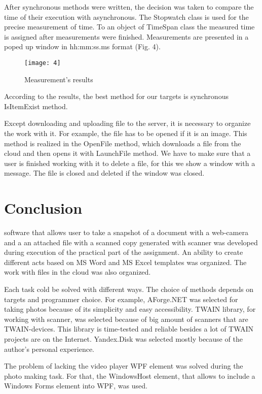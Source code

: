 \documentclass[12pt,journal,compsoc]{D:/Магистратура/English/bare_conf/IEEEtran}
\begin{document}
After synchronous methods were written, the decision was taken to compare the time of their execution with asynchronous. The Stopwatch class is used for the precise measurement of time. To an object of TimeSpan class the measured time is assigned after measurements were finished. Measurements are presented in a poped up window in hh:mm:ss.ms format (Fig. 4).
\begin{figure}[h]
\centering
\texttt{[image: 4]}
\centering
\caption{Measurement's results}
\end{figure}

According to the results, the best method for our targets is synchronous IsItemExist method.

Except downloading and uploading file to the server, it is necessary to organize the work with it. For example, the file has to be opened if it is an image. This method is realized in the OpenFile method, which downloads a file from the cloud and then opens it with LaunchFile method. We have to make sure that a user is finished working with it to delete a file, for this we show a window with a message. The file is closed and deleted if the window was closed.

\section{Conclusion}
 software that allows user to take a snapshot of a document with a web-camera and a an attached file with a scanned copy generated with scanner was developed during execution of the practical part of the assignment. An ability to create different acts based on MS Word and MS Excel templates was organized. The work with files in the cloud was also organized.

Each task cold be solved with different ways. The choice of methods depends on  targets and programmer choice. For example, AForge.NET was selected for taking photos because of its simplicity and easy accessibility. TWAIN library, for working with scanner, was selected because of big amount of scanners that are TWAIN-devices. This library is time-tested and reliable besides a lot of TWAIN projects are on the Internet. Yandex.Disk was selected mostly because of the author’s personal experience.

The problem of lacking the video player WPF element was solved during the photo making task. For that, the WindowsHost element, that allows to include a Windows Forms element into WPF, was used.
\end{document}
